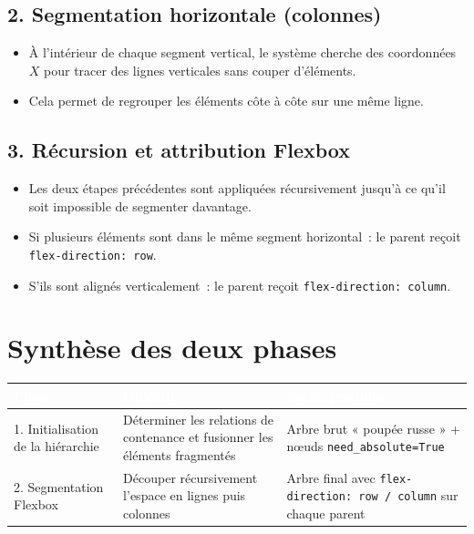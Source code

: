 \documentclass[11pt,a4paper]{article}
\newcommand{\code}[1]{\texttt{#1}}
\begin{document}
\subsection*{2. Segmentation horizontale (colonnes)}
\begin{itemize}[leftmargin=1.2em, itemsep=4pt]
  \item À l'intérieur de chaque segment vertical, le système cherche des coordonnées $X$ pour tracer des lignes verticales sans couper d'éléments.
  \item Cela permet de regrouper les éléments côte à côte sur une même ligne.
\end{itemize}

\subsection*{3. Récursion et attribution Flexbox}
\begin{itemize}[leftmargin=1.2em, itemsep=4pt]
  \item Les deux étapes précédentes sont appliquées récursivement jusqu'à ce qu'il soit impossible de segmenter davantage.
  \item Si plusieurs éléments sont dans le même segment horizontal~: le parent reçoit \code{flex-direction: row}.
  \item S'ils sont alignés verticalement~: le parent reçoit \code{flex-direction: column}.
\end{itemize}

\section*{Synthèse des deux phases}

\begin{table}[h!]
\centering
\renewcommand{\arraystretch}{1.4}
\begin{tabularx}{\textwidth}{|>{\raggedright\arraybackslash}p{3.4cm}|>{\raggedright\arraybackslash}X|>{\raggedright\arraybackslash}X|}
\hline
\rowcolor{tablehead}
\textcolor{white}{\textbf{Phase}} & \textcolor{white}{\textbf{Objectif}} & \textcolor{white}{\textbf{Sortie produite}} \\
\hline
\rowcolor{white}
1. Initialisation de la hiérarchie &
Déterminer les relations de contenance et fusionner les éléments fragmentés &
Arbre brut « poupée russe » + nœuds \code{need\_absolute=True} \\
\hline
\rowcolor{rowalt}
2. Segmentation Flexbox &
Découper récursivement l'espace en lignes puis colonnes &
Arbre final avec \code{flex-direction: row / column} sur chaque parent \\
\hline
\end{tabularx}
\end{table}
\end{document}
